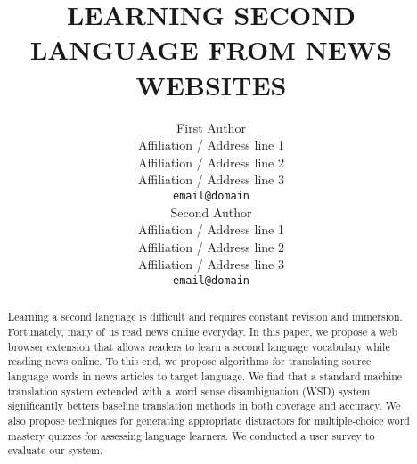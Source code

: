 \documentclass[11pt]{article}
\title{LEARNING SECOND LANGUAGE FROM NEWS WEBSITES}
\author{First Author \\
  Affiliation / Address line 1 \\
  Affiliation / Address line 2 \\
  Affiliation / Address line 3 \\
  {\tt email@domain} \\\And
  Second Author \\
  Affiliation / Address line 1 \\
  Affiliation / Address line 2 \\
  Affiliation / Address line 3 \\
  {\tt email@domain} \\}
\date{}
\begin{document}
\maketitle
\begin{abstract}


Learning a second language is difficult and requires
constant revision and immersion.  Fortunately, many of us 
read news online everyday. In this paper, we propose a web browser extension that allows readers to learn a second language vocabulary 
while reading news online. To this end, we propose algorithms for 
translating source language words in news articles to target 
language. We find that a standard machine translation system extended 
with a word sense disambiguation (WSD) system significantly betters baseline translation methods in both coverage and accuracy.
We also propose techniques for generating appropriate distractors for multiple-choice word mastery quizzes for assessing language learners.
We conducted a user survey to evaluate our system.

\end{abstract}









%
%



\end{document}
